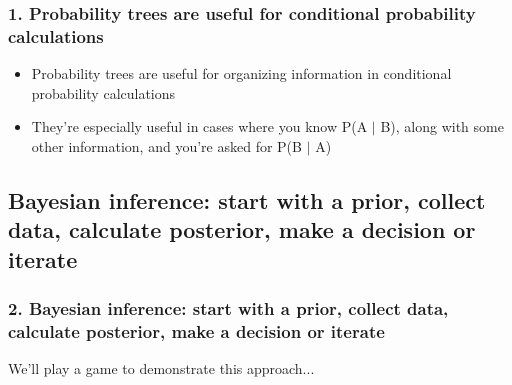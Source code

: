 \documentclass[slidestop,compress,mathserif,12pt,t,professionalfonts,xcolor=table]{beamer}
\begin{document}

\begin{frame}
\frametitle{1. Probability trees are useful for conditional probability calculations}

\begin{itemize}

\item Probability trees are useful for organizing information in conditional probability calculations

\item They're especially useful in cases where you know P(A $|$ B), along with some other information, and you're asked for P(B $|$ A)

\end{itemize}


\end{frame}


\subsection{Bayesian inference: start with a prior, collect data, calculate posterior, make a decision or iterate}
\label{mi2}


\begin{frame}
\frametitle{2. Bayesian inference: start with a prior, collect data, calculate posterior, make a decision or iterate}

\vfill

We'll play a game to demonstrate this approach...

\vfill

\end{frame}

\end{document}
